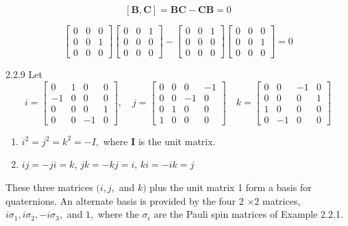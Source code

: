 $$[\mathbf{B}, \mathbf{C}] = \mathbf{BC}-\mathbf{C}\mathbf{B} = 0$$

$$\begin{bmatrix}{0} & {0} & {0} \\ {0} & {0} & {1} \\ {0} & {0} & {0}\end{bmatrix}\begin{bmatrix}{0} & {0} & {1} \\ {0} & {0} & {0} \\ {0} & {0} & {0}\end{bmatrix}- \begin{bmatrix}{0} & {0} & {1} \\ {0} & {0} & {0} \\ {0} & {0} & {0}\end{bmatrix}\begin{bmatrix}{0} & {0} & {0} \\ {0} & {0} & {1} \\ {0} & {0} & {0}\end{bmatrix} = 0 $$


\newpage

\begin{mybox}{2.2.9}
Let
$$
i=\begin{bmatrix}{0} & {1} & {0} & {0} \\ {-1} & {0} & {0} & {0} \\ {0} & {0} & {0} & {1} \\ {0} & {0} & {-1} & {0}\end{bmatrix}, \quad j=\begin{bmatrix}{0} & {0} & {0} & {-1} \\ {0} & {0} & {-1} & {0} \\ {0} & {1} & {0} & {0} \\ {1} & {0} & {0} & {0}\end{bmatrix} \quad k=\begin{bmatrix}{0} & {0} & {-1} & {0} \\ {0} & {0} & {0} & {1} \\ {1} & {0} & {0} & {0} \\ {0} & {-1} & {0} & {0}\end{bmatrix}
$$

\begin{enumerate}[$(a)$]
\item $i^{2}=j^{2}=k^{2}=-I,$ where $\mathbf{I}$ is the unit matrix. 
\item $ij=-ji=k$, $jk=-k j=i$, $ki=-ik=j$
\end{enumerate}

These three matrices $(i, j,$ and $k)$ plus the unit matrix 1 form a basis for quaternions. An alternate basis is provided by the four 2 $\times 2$ matrices, $i \sigma_{1}, i \sigma_{2},-i \sigma_{3},$ and $1,$ where the $\sigma_{i}$ are the Pauli spin matrices of Example 2.2.1.
\end{mybox}


